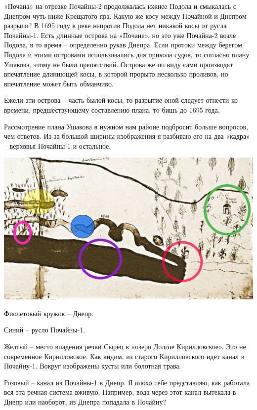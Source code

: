 «Почана» на отрезке Почайны-2 продолжалась южнее Подола и смыкалась с Днепром чуть ниже Крещатого яра. Какую же косу между Почайной и Днепром разрыли? В 1695 году в реке напротив Подола нет никакой косы от русла Почайны-1. Есть длинные острова на «Почане», но это уже Почайна-2 возле Подола, в то время – определенно рукав Днепра. Если протоки между берегом Подола и этими островами использовались для прикола судов, то согласно плану Ушакова, этому не было препятствий. Острова же по виду сами производят впечатление длиннющей косы, в которой прорыто несколько проливов, но впечатление может быть обманчиво.

Ежели эти острова – часть былой косы, то разрытие оной следует отнести ко времени, предшествующему составлению плана, то бишь до 1695 года.

Рассмотрение плана Ушакова в нужном нам районе подбросит больше вопросов, чем ответов. Из-за большой ширины изображения я разбиваю его на два «кадра» – верховья Почайны-1 и остальное. 
\vspace*{\fill}
\begin{center}
\includegraphics[width=\linewidth]{chast-colebanie-osnov/pochayna/po1695-p2ist.jpg}
\end{center}
\vspace*{\fill}
\newpage

Фиолетовый кружок – Днепр.

Синий – русло Почайны-1.

Желтый – место впадения речки Сырец в «озеро Долгое Кирилловское». Это не современное Кирилловское. Как видим, из старого Кирилловского идет канал в Почай\-ну-1. Вокруг изображены кусты или болотная трава.

Розовый – канал из Почайны-1 в Днепр. Я плохо себе представляю, как работала вся эта речная система вживую. Например, вода через этот канал вытекала в Днепр или наоборот, из Днепра попадала в Почайну?

